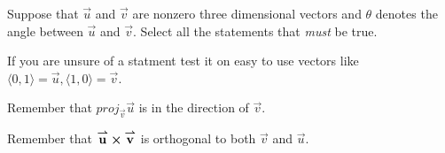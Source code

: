 \documentclass{ximera}
\author{Jim Talamo}
\begin{document}
\begin{exercise}
Suppose that $\vec u $ and $\vec v $ are nonzero three dimensional vectors and $\theta$ denotes the angle between $\vec u$ and $\vec v$. Select all the statements that \emph{must} be true.

\begin{selectAll}
\end{selectAll}

\begin{hint}
If you are unsure of a statment test it on easy to use vectors like $\langle 0,1 \rangle =\vec u , \langle 1,0 \rangle = \vec v$.
\end{hint}

\begin{hint}
Remember that $proj_{\vec v} \vec u$ is in the direction of $\vec v$.
\end{hint}

\begin{hint}
Remember that ${\overset{\boldsymbol{\rightharpoonup}}{\mathbf{u}}} \boldsymbol\times {\overset{\boldsymbol{\rightharpoonup}}{\mathbf{v}}}$ is orthogonal to both $\vec v$ and $\vec u$.
\end{hint}

\end{exercise}
\end{document}
